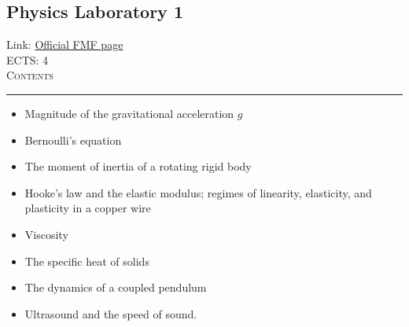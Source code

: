 \documentclass[11pt, a4paper]{article}
\newenvironment{course}[3]{
\subsection{#1}%
Link: \href{#2}{Official FMF page}\\%
ECTS: #3%
\vspace{1ex}
\\
{\large \textsc{Contents}}\\[-0.9ex]%
\rule{\textwidth}{0.5pt}
\vspace{-3ex}
}
{}
\newenvironment{chapter}[1]{
\begin{tcolorbox}[title=#1, breakable]
}
{\end{tcolorbox}}
\begin{document}
\begin{course}{Physics Laboratory 1}{https://www.fmf.uni-lj.si/en/study-physics/programmes/1fiz/2020/7000777/courses/1142/}{4}
    \label{physics-laboratory-1}

    \begin{chapter}{Experiments}
        \begin{itemize}
        
            \item Magnitude of the gravitational acceleration $ g $

            \item Bernoulli's equation

            \item The moment of inertia of a rotating rigid body

            \item Hooke's law and the elastic modulus; regimes of linearity, elasticity, and plasticity in a copper wire

            \item Viscosity

            \item The specific heat of solids

            \item The dynamics of a coupled pendulum

            \item Ultrasound and the speed of sound.
        
        \end{itemize}
    \end{chapter}

\end{course}
\end{document}
